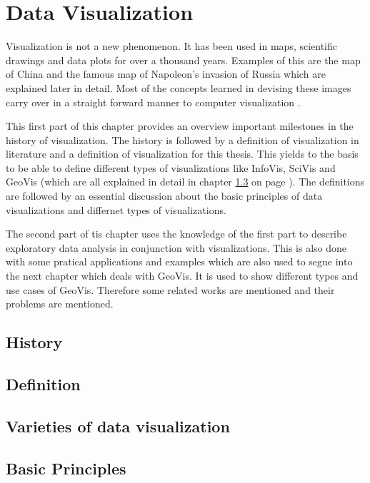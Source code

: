 \section{Data Visualization}
Visualization is not a new phenomenon. It has been used in maps, scientific drawings and data plots for over a thousand years. Examples of this are the map of China and the famous map of Napoleon's invasion of Russia which are explained later in detail. Most of the concepts learned in devising these images carry over in a straight forward manner to computer visualization .

This first part of this chapter provides an overview important milestones in the history of visualization. The history is followed by a definition of visualization in literature and a definition of visualization for this thesis. This yields to the basis to be able to define different types of visualizations like \ac{InfoVis}, \ac{SciVis} and \ac{GeoVis} (which are all explained in detail in chapter \ref{s:definitions-types} on page \pageref{s:definitions-types}). The definitions are followed by an essential discussion about the basic principles of data visualizations and differnet types of visualizations.

The second part of tis chapter uses the knowledge of the first part to describe exploratory data analysis in conjunction with visualizations. This is also done with some pratical applications and examples which are also used to segue into the next chapter which deals with \ac{GeoVis}. It is used to show different types and use cases of \ac{GeoVis}. Therefore some related works are mentioned and their problems are mentioned.

\subsection{History}


\subsection{Definition}


\subsection{Varieties of data visualization}
\label{s:definitions-types}

\subsection{Basic Principles}
\label{s:basics}
